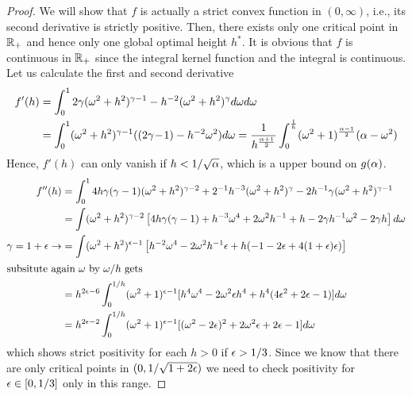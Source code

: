 \documentclass[smallabstract,smallcaptions]{dccpaper}
\begin{document}
\begin{proof}
We will show that $f$ is actually a strict convex function in $(0,\infty)$, i.e., its second derivative is strictly
positive. Then, there exists only one critical point in ${\mathbb R}_+$ and hence only one global optimal height $h^*$.
It is obvious that $f$ is continuous in
${\mathbb R}_+$ since the integral kernel function and the integral is continuous.  Let us calculate the 
first and second derivative 
%
\begin{align}
f'(h)  &=\int_{0}^{1} 2\gamma (\omega^2+h^2)^{\gamma-1} - h^{-2}(\omega^2+h^2)^{\gamma} d\omega d\omega\label{eq:fprime} \\
&= \int_0^{1} (\omega^2+h^2)^{\gamma-1}( (2\gamma\!-\!1)-h^{-2}\omega^2)d\omega
=\frac{1}{h^{\frac{\alpha+1}{2}}}\int_{0}^{\frac{1}{h}} (\omega^2+1)^{\frac{\alpha-1}{2}}
(\alpha-\omega^2)\notag
\end{align}
Hence, $f'(h)$ can only vanish if $h<1/\sqrt{\alpha}$, which is a upper bound on $g(\alpha)$.
\begin{align}
f''(h) &=\int_0^1 4h\gamma(\gamma-1)(\omega^2+h^2)^{\gamma-2} + 2^{-1}h^{-3}(\omega^2+h^2)^{\gamma} - 2h^{-1}\gamma(\omega^2+h^2)^{\gamma-1}\\
&= \int (\omega^2+h^2)^{\gamma-2}\left[ 4h\gamma(\gamma-1)+h^{-3}\omega^4 + 2\omega^2 h^{-1} +h -2\gamma h^{-1}\omega^2-2\gamma h\right]d
\omega\notag\\
\gamma=1+\epsilon\rightarrow &= \int (\omega^2+h^2)^{\epsilon-1}\left[h^{-2} \omega^4 -2\omega^2 h^{-1}\epsilon+h(-1-2\epsilon+4(1+\epsilon)\epsilon)\right] \\
\intertext{subsitute again $\omega$ by $\omega/h$ gets}
&=h^{2\epsilon-6}\int_0^{1/h}(\omega^2+1)^{\epsilon-1}[h^4\omega^4-2\omega^2\epsilon h^{4} +h^{4}(4\epsilon^2+2\epsilon-1)]d\omega\\
&=h^{2\epsilon-2}\int_0^{1/h}(\omega^2+1)^{\epsilon-1}[ (\omega^2-2\epsilon)^2 +2\omega^2\epsilon +2\epsilon-1]d\omega
\end{align}
%
which shows strict positivity for each $h>0$ if $\epsilon>1/3$. Since we know that there are only critical points in
$(0,1/\sqrt{1+2\epsilon})$ we need to check positivity for $\epsilon\in[0,1/3]$ only in this range.


\end{proof}
\end{document}
